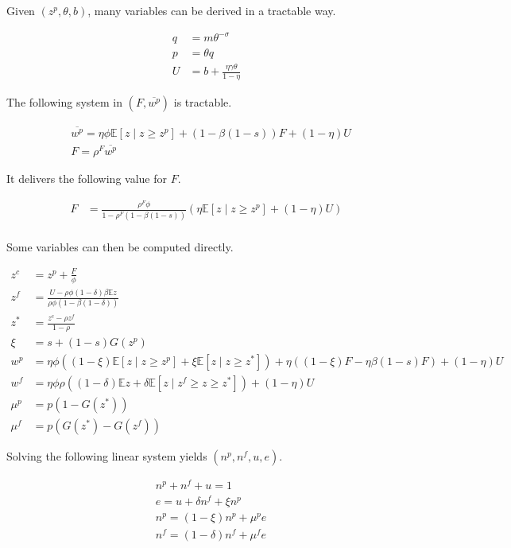 Given $\left( z^p , \theta, b \right)$, many variables can be derived in a tractable way.

\begin{align*}
q &= m \theta^{-\sigma}\\
p &= \theta q\\
U &= b + \frac{\eta \gamma \theta}{1-\eta}
\end{align*}

The following system in $\left( F, \overline{w^p} \right)$ is tractable.

\begin{align*}
&\overline{w^p} = \eta \phi \mathbb{E} \left[ z \mid z \geq z^p \right] + (1-\beta(1-s)) F + (1-\eta) U \\
&F = \rho^F \overline{w^p} 
\end{align*}

It delivers the following value for $F$.

\begin{align*}
F &= \frac{\rho^F \phi}{1 - \rho^F (1 - \beta (1-s))} \left( \eta \mathbb{E} \left[ z \mid z \geq z^p \right] + (1-\eta) U \right)\\
\end{align*}

Some variables can then be computed directly.

\begin{align*}
z^c &= z^p + \frac{F}{\phi} \\
z^f &= \frac{U - \rho \phi (1-\delta) \beta \mathbb{E}z}{\rho \phi \left( 1-\beta (1-\delta)\right)}\\
z^* &= \frac{z^c - \rho z^f}{1-\rho}\\
\xi &= s + (1-s) G\left( z^p \right)\\
w^p &= \eta \phi \left( (1-\xi) \mathbb{E} \left[ z \mid z \geq z^p \right] + \xi \mathbb{E} \left[ z \mid z \geq z^* \right]\right) + \eta \left( (1-\xi) F - \eta \beta (1-s) F \right) + (1-\eta) U\\
w^f &= \eta \phi \rho \left( (1-\delta) \mathbb{E} z + \delta \mathbb{E} \left[ z \mid z^f \geq z \geq z^* \right] \right) + (1-\eta) U\\
\mu^p &= p \left( 1-G\left( z^*\right)\right)\\
\mu^f &= p \left( G\left( z^*\right) - G\left( z^f\right) \right)
\end{align*}

Solving the following linear system yields $\left( n^p, n^f, u, e\right)$.

\begin{align*}
&n^p + n^f + u = 1\\
&e = u + \delta n^f + \xi n^p\\
&n^p =  \left(1-\xi\right) n^p + \mu^p e\\
&n^f =  \left(1-\delta\right) n^f + \mu^f e
\end{align*}

